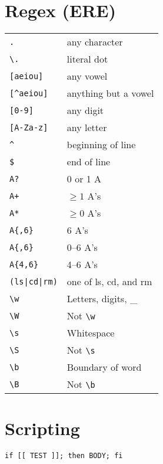 \documentclass[a4paper, twocolumn]{article}
\renewcommand{\tt}{\texttt}
\begin{document}
\section{Regex (ERE)}
\begin{tabular}{ll}
    \verb|.|            & any character                             \\
    \verb|\.|           & literal dot                               \\
    \verb|[aeiou]|      & any vowel                                 \\
    \verb|[^aeiou]|     & anything but a vowel                      \\
    \verb|[0-9]|        & any digit                                 \\
    \verb|[A-Za-z]|     & any letter                                \\
    \verb|^|            & beginning of line                         \\
    \verb|$|            & end of line                               \\
    \verb|A?|           & 0 or 1 A                                  \\
    \verb|A+|           & $\ge 1$ A's                               \\
    \verb|A*|           & $\ge 0$ A's                               \\
    \verb|A{,6}|        & 6 A's                                     \\
    \verb|A{,6}|        & 0--6 A's                                  \\
    \verb|A{4,6}|       & 4--6 A's                                  \\
    \verb!(ls|cd|rm)!   & one of ls, cd, and rm                     \\
    \verb|\w|           & Letters, digits, \_                       \\
    \verb|\W|           & Not \verb|\w|                             \\
    \verb|\s|           & Whitespace                                \\
    \verb|\S|           & Not \verb|\s|                             \\
    \verb|\b|           & Boundary of word                          \\
    \verb|\B|           & Not \verb|\b|
\end{tabular}

\section{Scripting}
\tt{if [[ TEST ]]; then BODY; fi}
\vspace{0.3cm}
\end{document}
